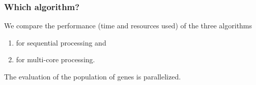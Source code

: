 \begin{frame}
\frametitle{
Which algorithm?
}
We compare the performance (time and resources used) of the three algorithms
\begin{enumerate}
\item for sequential processing and 
 
\item for multi-core processing.
\end{enumerate}
 
The evaluation of the population of genes is parallelized.
\end{frame}